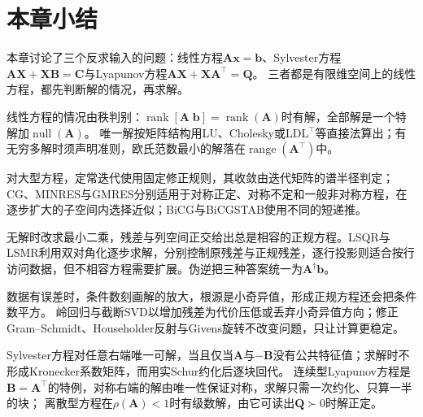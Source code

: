 \section{本章小结}
\label{sec:ls-equations-summary}

本章讨论了三个反求输入的问题：线性方程$\bm A\bm x=\bm b$、Sylvester方程$\bm A\bm X+\bm X\bm B=\bm C$与Lyapunov方程$\bm A\bm X+\bm X\bm A^\top=\bm Q$。
三者都是有限维空间上的线性方程，都先判断解的情况，再求解。

线性方程的情况由秩判别：$\operatorname{rank}[\bm A\;\bm b]=\operatorname{rank}(\bm A)$时有解，全部解是一个特解加$\operatorname{null}(\bm A)$。
唯一解按矩阵结构用LU、Cholesky或LDL$^{\top}$等直接法算出；有无穷多解时须声明准则，欧氏范数最小的解落在$\operatorname{range}(\bm A^\top)$中。

对大型方程，定常迭代使用固定修正规则，其收敛由迭代矩阵的谱半径判定；CG、MINRES与GMRES分别适用于对称正定、对称不定和一般非对称方程，在逐步扩大的子空间内选择近似；BiCG与BiCGSTAB使用不同的短递推。

无解时改求最小二乘，残差与列空间正交给出总是相容的正规方程。LSQR与LSMR利用双对角化逐步求解，分别控制原残差与正规残差，逐行投影则适合按行访问数据，但不相容方程需要扩展。伪逆把三种答案统一为$\bm A^\dagger\bm b$。

数据有误差时，条件数刻画解的放大，根源是小奇异值，形成正规方程还会把条件数平方。
岭回归与截断SVD以增加残差为代价压低或丢弃小奇异值方向；修正Gram--Schmidt、Householder反射与Givens旋转不改变问题，只让计算更稳定。

Sylvester方程对任意右端唯一可解，当且仅当$\bm A$与$-\bm B$没有公共特征值；求解时不形成Kronecker系数矩阵，而用实Schur约化后逐块回代。
连续型Lyapunov方程是$\bm B=\bm A^\top$的特例，对称右端的解由唯一性保证对称，求解只需一次约化、只算一半的块；
离散型方程在$\rho(\bm A)<1$时有级数解，由它可读出$\bm Q\succ0$时解正定。

